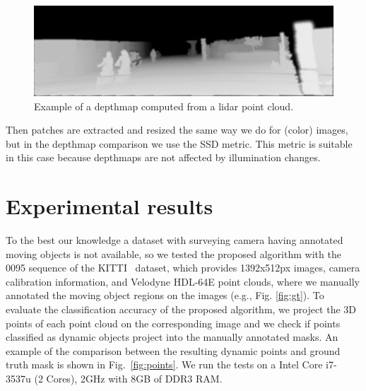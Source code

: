 \begin{figure}[t]
\centering
\includegraphics[width=0.98\columnwidth]{./img/ch-laser/depth-0129}
\caption{Example of a depthmap computed from a lidar point cloud.}
\label{fig:depth}
\end{figure}

Then patches are extracted and resized the same way we do for (color) images, but in the depthmap comparison we use the SSD metric. This metric is suitable in this case because depthmaps are not affected by illumination changes.

\section{Experimental results}%
\label{sec:experiments}
To the best our knowledge a dataset with surveying camera having annotated moving objects is not available, so we tested the proposed algorithm with the 0095 sequence of the KITTI~\cite{Kitti} dataset, which provides 1392x512px images, camera calibration information, and Velodyne HDL-64E point clouds, where we manually annotated the moving object regions on the images (e.g., Fig. \ref{fig:gt}). To evaluate the classification accuracy of the proposed algorithm, we project the 3D points of each point cloud on the corresponding image and we check if points classified as dynamic objects project into the manually annotated masks. An example of the comparison between the resulting dynamic points and ground truth mask is shown in Fig.~\ref{fig:points}.
We run the tests on a  Intel Core i7-3537u (2 Cores), 2GHz with 8GB of DDR3 RAM.

